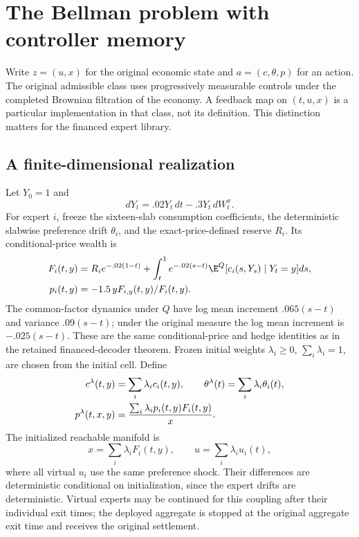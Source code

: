 \section{The Bellman problem with controller memory}\label{sec:r24state}
Write $z=(u,x)$ for the original economic state and $a=(c,\theta,p)$ for an action. The original admissible class uses progressively measurable controls under the completed Brownian filtration of the economy. A feedback map on $(t,u,x)$ is a particular implementation in that class, not its definition. This distinction matters for the financed expert library.

\subsection{A finite-dimensional realization}
Let $Y_0=1$ and
\[
 dY_t=.02Y_t\,dt-.3Y_t\,dW^x_t.
\]
For expert $i$, freeze the sixteen-slab consumption coefficients, the deterministic slabwise preference drift $\theta_i$, and the exact-price-defined reserve $R_i$. Its conditional-price wealth is
\begin{equation}
\begin{aligned}
 F_i(t,y)&=R_i e^{-.02(1-t)}+\int_t^1e^{-.02(s-t)}\E^Q[c_i(s,Y_s)\mid Y_t=y]ds,\\
 p_i(t,y)&=-1.5\,yF_{i,y}(t,y)/F_i(t,y).
\end{aligned}
 \label{eq:r24price}
\end{equation}
The common-factor dynamics under $Q$ have log mean increment $.065(s-t)$ and variance $.09(s-t)$; under the original measure the log mean increment is $-.025(s-t)$. These are the same conditional-price and hedge identities as in the retained financed-decoder theorem. Frozen initial weights $\lambda_i\geq0$, $\sum_i\lambda_i=1$, are chosen from the initial cell. Define
\begin{align}
 c^\lambda(t,y)&=\sum_i\lambda_i c_i(t,y),\qquad
 \theta^\lambda(t)=\sum_i\lambda_i\theta_i(t),\notag\\
 p^\lambda(t,x,y)&={\sum_i\lambda_i p_i(t,y)F_i(t,y)\over x}.
 \label{eq:r24policy}
\end{align}
The initialized reachable manifold is
\begin{equation}
 x=\sum_i\lambda_iF_i(t,y),\qquad u=\sum_i\lambda_i u_i(t),
 \label{eq:r24manifold}
\end{equation}
where all virtual $u_i$ use the same preference shock. Their differences are deterministic conditional on initialization, since the expert drifts are deterministic. Virtual experts may be continued for this coupling after their individual exit times; the deployed aggregate is stopped at the original aggregate exit time and receives the original settlement.

